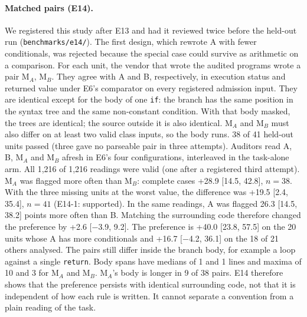 \paragraph{Matched pairs (E14).} We registered this study after E13 and had it reviewed twice before the
held-out run (\texttt{benchmarks/e14/}). The first design, which rewrote A with fewer conditionals, was rejected
because the special case could survive as arithmetic on a comparison. For each unit, the vendor that wrote
the audited programs wrote a pair M$_A$, M$_B$. They agree with A and B, respectively, in execution status and
returned value under E6's comparator on every registered admission input. They are identical except for the
body of one \texttt{if}: the branch has the same position in the syntax tree and the same non-constant condition.
With that body masked, the trees are identical; the source outside it is also identical. M$_A$ and M$_B$ must
also differ on at least two valid class inputs, so the body runs. 38 of 41 held-out units passed (three gave
no parseable pair in three attempts). Auditors read A, B, M$_A$ and M$_B$ afresh in E6's four configurations,
interleaved in the task-alone arm. All 1{,}216 of 1{,}216 readings were valid (one after a registered third attempt).
M$_A$ was flagged more often than M$_B$: complete cases +28.9 [14.5, 42.8], $n=38$. With the three missing
units at the worst value, the difference was +19.5 [2.4, 35.4], $n=41$ (E14-1: supported).
In the same readings, A was flagged 26.3 [14.5, 38.2] points more often than B. Matching the surrounding code
therefore changed the preference by +2.6 [$-$3.9, 9.2]. The preference is +40.0 [23.8, 57.5] on the 20 units
whose A has more conditionals and +16.7 [$-$4.2, 36.1] on the 18 of 21 others analysed.
The pairs still differ inside the branch body, for example a loop against a single \texttt{return}.
Body spans have medians of 1 and 1 lines and maxima of 10 and 3 for M$_A$ and M$_B$.
M$_A$'s body is longer in 9 of 38 pairs. E14 therefore shows that the preference persists with identical
surrounding code, not that it is independent of how each rule is written. It cannot separate a convention
from a plain reading of the task.

